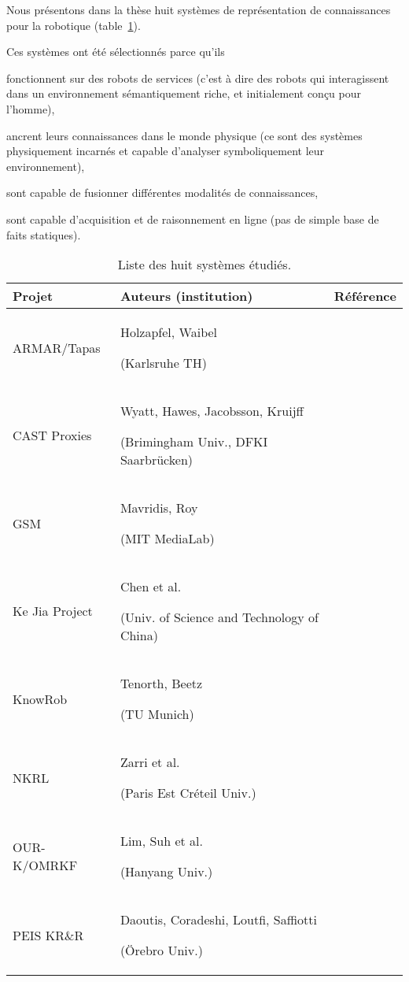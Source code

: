 Nous présentons dans la thèse huit systèmes de représentation de connaissances pour la robotique (table~\ref{table|surveyed-systems}).

Ces systèmes ont été sélectionnés parce qu'ils
\begin{inparaenum} 
    \item fonctionnent sur des robots de services (c'est à dire des robots qui interagissent dans un environnement sémantiquement riche, et initialement conçu pour l'homme),
    \item  ancrent leurs connaissances dans le monde physique (ce sont des systèmes physiquement incarnés et capable d'analyser symboliquement leur environnement),
    \item  sont capable de fusionner différentes modalités de connaissances,
    \item  sont capable d'acquisition et de raisonnement en ligne (pas de simple base de faits statiques).
\end{inparaenum}


\begin{table}\scriptsize
\begin{center}

\begin{tabular}{p{2.2cm}p{6cm}p{2cm}}
\toprule
{\bf Projet} & {\bf Auteurs (institution)} & Référence \\
\midrule
ARMAR/Tapas & Holzapfel, Waibel \par (Karlsruhe TH) & \cite{Holzapfel2008}\\
CAST Proxies & Wyatt, Hawes, Jacobsson, Kruijff \par (Brimingham Univ., DFKI Saarbrücken) & \cite{Jacobsson2008} \\
GSM & Mavridis, Roy \par (MIT MediaLab) & \cite{Mavridis2006} \\
Ke Jia Project & Chen et al. \par (Univ. of Science and Technology of China) & \cite{Chen2010} \\
{\sc KnowRob} & Tenorth, Beetz \par (TU Munich) & \cite{Tenorth2009a} \\
NKRL & Zarri et al. \par (Paris Est Créteil Univ.) & \cite{Sabri2011} \\
OUR-K/OMRKF & Lim, Suh et al. \par (Hanyang Univ.) & \cite{Lim2011, Suh2007} \\
PEIS KR\&R & Daoutis, Coradeshi, Loutfi, Saffiotti \par (Örebro Univ.) & \cite{Daoutis2009} \\

\bottomrule

\end{tabular}
\end{center}

\caption{Liste des huit systèmes étudiés.}

\label{table|surveyed-systems}
\end{table}

